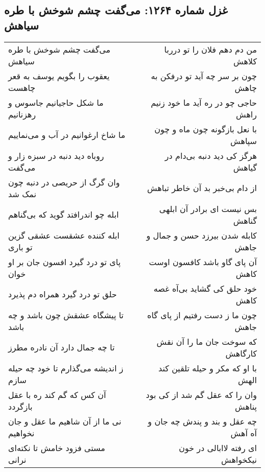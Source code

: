 \begin{center}
\section*{غزل شماره ۱۲۶۴: می‌گفت چشم شوخش با طره سیاهش}
\label{sec:1264}
\begin{longtable}{l p{0.5cm} r}
می‌گفت چشم شوخش با طره سیاهش
&&
من دم دهم فلان را تو درربا کلاهش
\\
یعقوب را بگویم یوسف به قعر چاهست
&&
چون بر سر چه آید تو درفکن به چاهش
\\
ما شکل حاجیانیم جاسوس و رهزنانیم
&&
حاجی چو در ره آید ما خود زنیم راهش
\\
ما شاخ ارغوانیم در آب و می‌نماییم
&&
با نعل بازگونه چون ماه و چون سپاهش
\\
روباه دید دنبه در سبزه زار و می‌گفت
&&
هرگز کی دید دنبه بی‌دام در گیاهش
\\
وان گرگ از حریصی در دنبه چون نمک شد
&&
از دام بی‌خبر بد آن خاطر تباهش
\\
ابله چو اندرافتد گوید که بی‌گناهم
&&
بس نیست ای برادر آن ابلهی گناهش
\\
ابله کننده عشقست عشقی گزین تو باری
&&
کابله شدن بیرزد حسن و جمال و جاهش
\\
پای تو درد گیرد افسون جان بر او خوان
&&
آن پای گاو باشد کافسون اوست کاهش
\\
حلق تو درد گیرد همراه دم پذیرد
&&
خود حلق کی گشاید بی‌آه غصه کاهش
\\
تا پیشگاه عشقش چون باشد و چه باشد
&&
چون ما ز دست رفتیم از پای گاه جاهش
\\
تا چه جمال دارد آن نادره مطرز
&&
که سوخت جان ما را آن نقش کارگاهش
\\
ز اندیشه می‌گذارم تا خود چه حیله سازم
&&
با او که مکر و حیله تلقین کند الهش
\\
آن کس که گم کند ره با عقل بازگردد
&&
وان را که عقل گم شد از کی بود پناهش
\\
نی ما از آن شاهیم ما عقل و جان نخواهیم
&&
چه عقل و بند و پندش چه جان و آه آهش
\\
مستی فزود خامش تا نکته‌ای نرانی
&&
ای رفته لاابالی در خون نیکخواهش
\\
\end{longtable}
\end{center}

